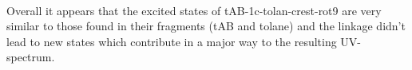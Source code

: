 %
%
\\
Overall it appears that the excited states of tAB-1c-tolan-crest-rot9 are very similar to those found in their fragments (tAB and tolane) and the linkage didn't lead to new states which contribute in a major way to the resulting UV-spectrum.
%
